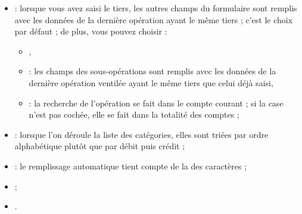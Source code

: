 \begin{itemize}
	\item {} : lorsque vous avez saisi le tiers, les autres champs du formulaire sont remplis avec les données de la dernière opération ayant le même tiers ; c'est le choix par défaut ; de plus, vous pouvez choisir :
		\begin{itemize}
			\item {},
			\item {} : les champs des sous-opérations sont remplis avec les données de la dernière opération ventilée ayant le même tiers que celui déjà saisi,
			\item {} : la recherche de l'opération se fait dans le compte courant ; si la case n'est pas cochée, elle se fait dans la totalité des comptes ;
		\end{itemize}
	\item {} : lorsque l'on déroule la liste des catégories, elles sont triées par ordre alphabétique plutôt que par débit puis crédit ;
	\item {} : le remplissage automatique tient compte de la  des caractères ;
	\item {} ;
	\item {}.
\end{itemize}

